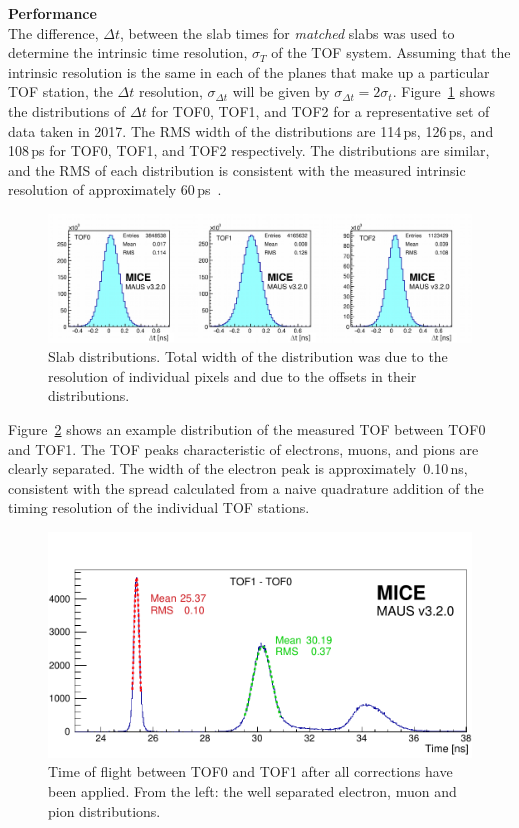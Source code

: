 \noindent\textbf{Performance} \\
\noindent
The difference, $\Delta t$, between the slab times for \textit{matched} slabs
was used to determine the intrinsic time resolution, $\sigma_T$ of the
TOF system.
Assuming that the intrinsic resolution is the same in each of the
planes that make up a particular TOF station, the $\Delta t$
resolution, $\sigma_{\Delta t}$ will be given by
$\sigma_{\Delta t}=2\sigma_t$.
Figure~\ref{fig:SlabDtAll} shows the distributions of $\Delta t$ for
TOF0, TOF1, and TOF2 for a representative set of data taken in 2017.
The RMS width of the distributions are 114\,ps, 126\,ps, and 108\,ps
for TOF0, TOF1, and TOF2 respectively.
The distributions are similar, and the RMS of each distribution is
consistent with the measured intrinsic resolution of approximately
60\,ps~\cite{2010NIMPA.615...14B}.
\begin{figure}
  \begin{center}
    \includegraphics[width=0.9\columnwidth]{07_overall_slab_dt_edited2.pdf}
  \end{center}
  \caption{
    Slab \Dt{} distributions.
    Total width of the distribution was due to the resolution of
    individual pixels and due to the offsets in their \Dt{}
    distributions.
  }
  \label{fig:SlabDtAll}
\end{figure}

Figure~\ref{fig:TOF_peaks} shows an example distribution of the
measured TOF between TOF0 and TOF1.
The TOF peaks characteristic of electrons, muons, and pions are
clearly separated.
The width of the electron peak is approximately~0.10\,ns,
consistent with the spread calculated from a naive quadrature addition
of the timing resolution of the individual TOF stations.
\begin{figure}
  \begin{center}
    \includegraphics[width=0.6\columnwidth]{TOF_peaks.pdf}
  \end{center}
  \caption{
    Time of flight between TOF0 and TOF1 after all corrections have
    been applied. From the left: the well separated electron, muon and
    pion distributions.
  } 
  \label{fig:TOF_peaks}
\end{figure}

